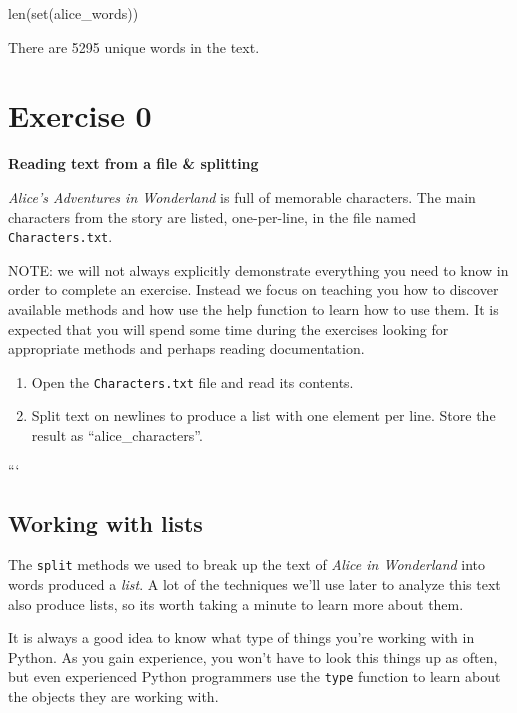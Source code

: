 \documentclass[]{book}
\newenvironment{Shaded}{\begin{snugshade}}{\end{snugshade}}
\newcommand{\BuiltInTok}[1]{#1}
\newcommand{\NormalTok}[1]{#1}
\begin{document}
\begin{Shaded}
\begin{Highlighting}[]
\BuiltInTok{len}\NormalTok{(}\BuiltInTok{set}\NormalTok{(alice_words))}
\end{Highlighting}
\end{Shaded}

There are 5295 unique words in the text.

\section{Exercise 0}\label{exercise-0-4}

\textbf{Reading text from a file \& splitting}

\emph{Alice's Adventures in Wonderland} is full of memorable characters.
The main characters from the story are listed, one-per-line, in the file
named \texttt{Characters.txt}.

NOTE: we will not always explicitly demonstrate everything you need to
know in order to complete an exercise. Instead we focus on teaching you
how to discover available methods and how use the help function to learn
how to use them. It is expected that you will spend some time during the
exercises looking for appropriate methods and perhaps reading
documentation.

\begin{enumerate}
\def\labelenumi{\arabic{enumi}.}
\item
  Open the \texttt{Characters.txt} file and read its contents.
\item
  Split text on newlines to produce a list with one element per line.
  Store the result as ``alice\_characters''.
\end{enumerate}

```

\subsection{Working with lists}\label{working-with-lists}

The \texttt{split} methods we used to break up the text of \emph{Alice
in Wonderland} into words produced a \emph{list}. A lot of the
techniques we'll use later to analyze this text also produce lists, so
its worth taking a minute to learn more about them.

It is always a good idea to know what type of things you're working with
in Python. As you gain experience, you won't have to look this things up
as often, but even experienced Python programmers use the \texttt{type}
function to learn about the objects they are working with.
\end{document}
